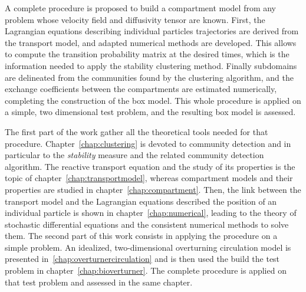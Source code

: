 A complete procedure is proposed to build a compartment model from any problem whose velocity field and diffusivity tensor are known. First, the Lagrangian equations describing individual particles trajectories are derived from the transport model, and adapted numerical methods are developed. This allows to compute the transition probability matrix at the desired times, which is the information needed to apply the stability clustering method. Finally subdomains are delineated from the communities found by the clustering algorithm, and the exchange coefficients between the compartments are estimated numerically, completing the construction of the box model. This whole procedure is applied on a simple, two dimensional test problem, and the resulting box model is assessed.  

The first part of the work gather all the theoretical tools needed for that procedure. Chapter~\ref{chap:clustering} is devoted to community detection and in particular to the \textit{stability} measure and the related community detection algorithm. The reactive transport equation and the study of its properties is the topic of chapter~\ref{chap:transportmodel}, whereas compartment models and their properties are studied in chapter~\ref{chap:compartment}. Then, the link between the transport model and the Lagrangian equations described the position of an individual particle is shown in chapter~\ref{chap:numerical}, leading to the theory of stochastic differential equations and the consistent numerical methods to solve them. The second part of this work consists in applying the procedure on a simple problem. An idealized, two-dimensional overturning circulation model is presented in~\ref{chap:overturnercirculation} and is then used the build the test problem in chapter~\ref{chap:bioverturner}. The complete procedure is applied on that test problem and assessed in the same chapter. 


